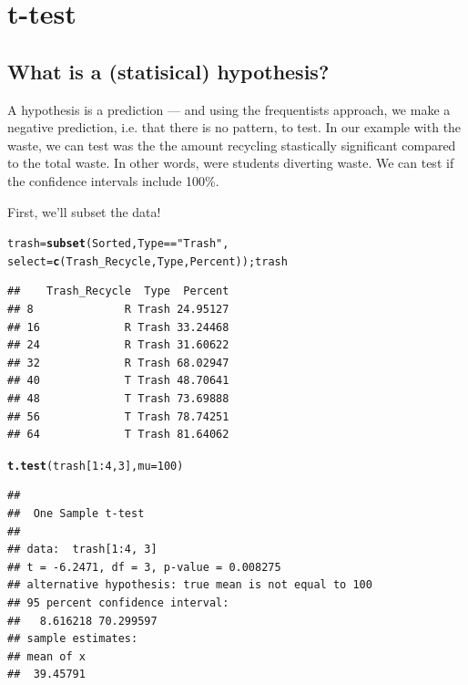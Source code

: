 \documentclass{tufte-handout}\usepackage[]{graphicx}\usepackage[]{color}
\makeatletter
\newcommand{\hlnum}[1]{\textcolor[rgb]{0.686,0.059,0.569}{#1}}%
\newcommand{\hlstr}[1]{\textcolor[rgb]{0.192,0.494,0.8}{#1}}%
\newcommand{\hlopt}[1]{\textcolor[rgb]{0,0,0}{#1}}%
\newcommand{\hlstd}[1]{\textcolor[rgb]{0.345,0.345,0.345}{#1}}%
\newcommand{\hlkwb}[1]{\textcolor[rgb]{0.69,0.353,0.396}{#1}}%
\newcommand{\hlkwc}[1]{\textcolor[rgb]{0.333,0.667,0.333}{#1}}%
\newcommand{\hlkwd}[1]{\textcolor[rgb]{0.737,0.353,0.396}{\textbf{#1}}}%
\newenvironment{kframe}{%
 \def\at@end@of@kframe{}%
 \ifinner\ifhmode%
  \def\at@end@of@kframe{\end{minipage}}%
  \begin{minipage}{\columnwidth}%
 \fi\fi%
 \def\FrameCommand##1{\hskip\@totalleftmargin \hskip-\fboxsep
 \colorbox{shadecolor}{##1}\hskip-\fboxsep
     \hskip-\linewidth \hskip-\@totalleftmargin \hskip\columnwidth}%
 \MakeFramed {\advance\hsize-\width
   \@totalleftmargin\z@ \linewidth\hsize
   \@setminipage}}%
 {\par\unskip\endMakeFramed%
 \at@end@of@kframe}
\newenvironment{knitrout}{}{} %
\makeatother
\begin{document}
\clearpage
\section{t-test}

\subsection{What is a (statisical) hypothesis?}

A hypothesis is a prediction --- and using the frequentists approach, we make a negative prediction, i.e. that there is no pattern, to test. In our example with the waste, we can test was the the amount recycling stastically significant compared to the total waste. In other words, were students diverting waste. We can test if the confidence intervals include 100\%. 

First, we'll subset the data!
\begin{knitrout}
\color{fgcolor}\begin{kframe}
\begin{alltt}
\hlstd{trash} \hlkwb{=} \hlkwd{subset}\hlstd{(Sorted, Type} \hlopt{==} \hlstr{"Trash"}\hlstd{,}
        \hlkwc{select} \hlstd{=} \hlkwd{c}\hlstd{(Trash_Recycle, Type, Percent)); trash}
\end{alltt}
\begin{verbatim}
##    Trash_Recycle  Type  Percent
## 8              R Trash 24.95127
## 16             R Trash 33.24468
## 24             R Trash 31.60622
## 32             R Trash 68.02947
## 40             T Trash 48.70641
## 48             T Trash 73.69888
## 56             T Trash 78.74251
## 64             T Trash 81.64062
\end{verbatim}
\end{kframe}
\end{knitrout}

\begin{knitrout}
\color{fgcolor}\begin{kframe}
\begin{alltt}
\hlkwd{t.test}\hlstd{(trash[}\hlnum{1}\hlopt{:}\hlnum{4}\hlstd{,}\hlnum{3}\hlstd{],} \hlkwc{mu}\hlstd{=}\hlnum{100}\hlstd{)}
\end{alltt}
\begin{verbatim}
## 
## 	One Sample t-test
## 
## data:  trash[1:4, 3]
## t = -6.2471, df = 3, p-value = 0.008275
## alternative hypothesis: true mean is not equal to 100
## 95 percent confidence interval:
##   8.616218 70.299597
## sample estimates:
## mean of x 
##  39.45791
\end{verbatim}
\end{kframe}
\end{knitrout}
\end{document}

